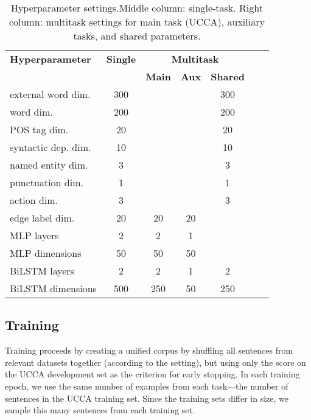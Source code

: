 \documentclass[11pt,a4paper]{article}
\begin{document}
\begin{table}
\centering
\footnotesize
\begin{tabular}{l|c|ccccc}
\bf Hyperparameter &  \bf Single & \multicolumn{3}{c}{\bf Multitask} \\ 
&& \bf Main & \bf Aux & \bf Shared \\
\hline
external word dim. & 300 &&& 300 \\
word dim. & 200 &&& 200 \\
POS tag dim. & 20 &&& 20 \\
syntactic dep. dim. & 10 &&& 10 \\
named entity dim. & 3 &&& 3 \\
punctuation dim. & 1 &&& 1 \\
action dim. & 3 &&& 3 \\
edge label dim. & 20 & 20 & 20 \\
MLP layers & 2 & 2 & 1 \\
MLP dimensions & 50 & 50 & 50 \\
BiLSTM layers & 2 & 2 & 1 & 2 \\
BiLSTM dimensions & 500 & 250 & 50 & 250
\end{tabular}
\caption{Hyperparameter settings.\label{tab:hyperparams}
Middle column: single-task.
Right column: multitask settings for main task (UCCA), auxiliary tasks, and shared parameters.}
\end{table}



\subsection{Training}

Training proceeds by creating a unified corpus by shuffling all sentences from relevant
datasets together (according to the setting),
but using only the score on the UCCA development set as the criterion for early stopping.
In each training epoch, we use the same number of examples from each task---the
number of sentences in the UCCA training set.
Since the training sets differ in size, we sample this many sentences from each training set.
\end{document}
